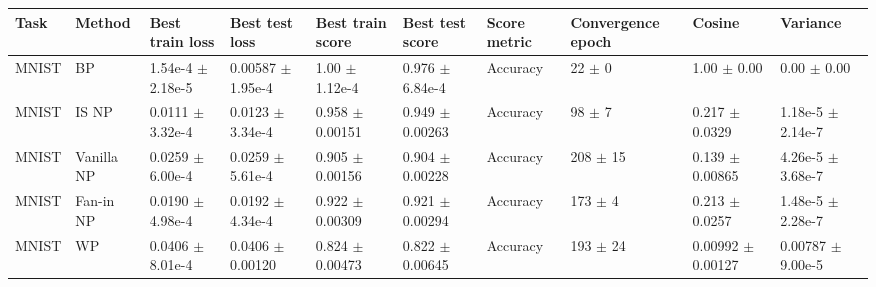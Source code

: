 \begin{tabular}{llllllllll}
\toprule
Task & Method & Best train loss & Best test loss & Best train score & Best test score & Score metric & Convergence epoch & Cosine & Variance \\
\midrule
MNIST & BP & 1.54e-4 $\pm$ 2.18e-5 & 0.00587 $\pm$ 1.95e-4 & 1.00 $\pm$ 1.12e-4 & 0.976 $\pm$ 6.84e-4 & Accuracy & 22 $\pm$ 0 & 1.00 $\pm$ 0.00 & 0.00 $\pm$ 0.00 \\
MNIST & IS NP & 0.0111 $\pm$ 3.32e-4 & 0.0123 $\pm$ 3.34e-4 & 0.958 $\pm$ 0.00151 & 0.949 $\pm$ 0.00263 & Accuracy & 98 $\pm$ 7 & 0.217 $\pm$ 0.0329 & 1.18e-5 $\pm$ 2.14e-7 \\
MNIST & Vanilla NP & 0.0259 $\pm$ 6.00e-4 & 0.0259 $\pm$ 5.61e-4 & 0.905 $\pm$ 0.00156 & 0.904 $\pm$ 0.00228 & Accuracy & 208 $\pm$ 15 & 0.139 $\pm$ 0.00865 & 4.26e-5 $\pm$ 3.68e-7 \\
MNIST & Fan-in NP & 0.0190 $\pm$ 4.98e-4 & 0.0192 $\pm$ 4.34e-4 & 0.922 $\pm$ 0.00309 & 0.921 $\pm$ 0.00294 & Accuracy & 173 $\pm$ 4 & 0.213 $\pm$ 0.0257 & 1.48e-5 $\pm$ 2.28e-7 \\
MNIST & WP & 0.0406 $\pm$ 8.01e-4 & 0.0406 $\pm$ 0.00120 & 0.824 $\pm$ 0.00473 & 0.822 $\pm$ 0.00645 & Accuracy & 193 $\pm$ 24 & 0.00992 $\pm$ 0.00127 & 0.00787 $\pm$ 9.00e-5 \\
\bottomrule
\end{tabular}

